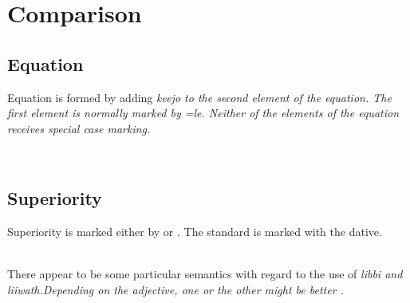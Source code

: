 \section{Comparison}\label{sec:func:Comparison}
\subsection{Equation}\label{sec:func:Equation}

Equation is formed by adding \em keejo \em to the second element of the equation. The first element is normally marked by \em =le\em. Neither of the elements of the equation receives special case marking.

 \\

\subsection{Superiority}\label{sec:func:Superiority}
Superiority is marked either by  or . The standard is marked with the dative.

 \\
There appear to be some particular semantics with regard to the use of \em libbi \em and \em liiwath.\em Depending on the adjective, one or the other might be better  .

